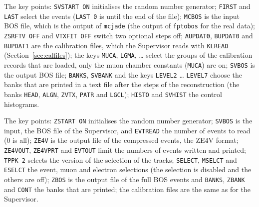 
The key points: \texttt{SVSTART ON} initialises the random number generator; \texttt{FIRST} and \texttt{LAST} select the events (\texttt{LAST 0} is until the end of the file); \texttt{MCBOS} is the input BOS file, which is the output of \texttt{mcjade} (the output of \texttt{fptobos} for the real data);
\texttt{ZSRFTV OFF} and \texttt{VTXFIT OFF} switch two optional steps off; \texttt{AUPDAT0}, \texttt{BUPDAT0} and \texttt{BUPDAT1} are the calibration files, which the Supervisor reads with \texttt{KLREAD} (Section~\ref{sec:calfiles}); the keys
\texttt{MUCA}, \texttt{LGMA}, \dots{} select the groups of the calibration records that are loaded, only the muon chamber constants (\texttt{MUCA}) are on; \texttt{SVBOS} is the output BOS file; \texttt{BANKS}, \texttt{SVBANK} and the keys \texttt{LEVEL2} \dots{} \texttt{LEVEL7} choose the banks that are
printed in a text file after the steps of the reconstruction (the banks \texttt{HEAD}, \texttt{ALGN}, \texttt{ZVTX}, \texttt{PATR} and \texttt{LGCL}); \texttt{HISTO} and \texttt{SVHIST} the control histograms.


The key points: \texttt{ZSTART ON} initialises the random number generator; \texttt{SVBOS} is the input, the BOS file of the Supervisor, and \texttt{EVTREAD} the number of events to read (0 is all); \texttt{ZE4V} is the output file of the compressed events, the ZE4V format;
\texttt{ZE4VOUT}, \texttt{ZE4VPRT} and \texttt{EVTOUT} limit the numbers of events written and printed; \texttt{TPPK 2} selects the version of the selection of the tracks; \texttt{SELECT}, \texttt{MSELCT} and \texttt{ESELCT} the event, muon and electron selections
(the selection is disabled and the others are off); \texttt{ZBOS} is the output file of the full BOS events and \texttt{BANKS}, \texttt{ZBANK} and \texttt{CONT} the banks that are printed; the calibration files are the same as for the Supervisor.

